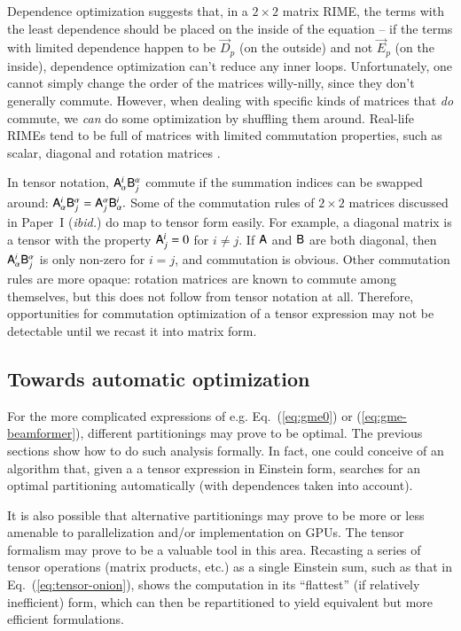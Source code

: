 \documentclass{aa}
\newcommand{\jones}[2]{\vec {#1}_{#2}}
\begin{document}
Dependence optimization suggests that, in a $2\times2$ matrix RIME, the terms with the least dependence should be placed on the inside of the equation -- if the terms with limited dependence happen to be $\jones{D}{p}$ (on the outside) and not $\jones{E}{p}$ (on the inside), dependence optimization can't reduce any inner loops.
Unfortunately, one cannot simply change the order of the matrices willy-nilly, since they don't generally commute. However, when dealing with specific kinds of matrices that \emph{do\/} commute, we \emph{can} do some optimization by shuffling them around. Real-life RIMEs tend to be full of matrices with limited commutation properties, such as scalar, diagonal and rotation matrices \cite[see Paper~I,][Sect.~1.6]{RRIME1}.

In tensor notation, $\mathsf{A}^i_\alpha \mathsf{B}^\alpha_j$ commute if the summation indices can be swapped around: $\mathsf{A}^i_\alpha \mathsf{B}^\alpha_j=\mathsf{A}^\alpha_j \mathsf{B}^i_\alpha.$  Some of the commutation rules of $2\times2$ matrices discussed in Paper~I (\emph{ibid.}) do map to tensor form easily. For example, a diagonal matrix is a tensor with the property $\mathsf{A}^i_j=0$ for $i\ne j$. If $\mathsf{A}$ and $\mathsf{B}$ are both diagonal, then $\mathsf{A}^i_\alpha \mathsf{B}^\alpha_j$ is only non-zero for $i=j$, and commutation is obvious. Other commutation rules are more opaque: rotation matrices are known to commute among themselves, but this does not follow from tensor notation at all.
Therefore, opportunities for commutation optimization of a tensor expression may not be detectable until we recast it into matrix form. 

\subsection{Towards automatic optimization}

For the more complicated expressions of e.g. Eq.~(\ref{eq:gme0}) or (\ref{eq:gme-beamformer}), different partitionings may prove to be optimal. The previous sections show how to do such analysis formally. In fact, one could conceive of an algorithm that, given a a tensor expression in Einstein form, searches for an optimal partitioning automatically (with dependences taken into account).

It is also possible that alternative partitionings may prove to be more or less amenable to parallelization and/or implementation on GPUs. The tensor formalism may prove to be a valuable tool in this area. Recasting a series of tensor operations (matrix products, etc.) as a single Einstein sum, such as that in Eq.~(\ref{eq:tensor-onion}), shows the computation in its ``flattest'' (if relatively inefficient) form, which can then be repartitioned to yield equivalent but more efficient formulations.
\end{document}
